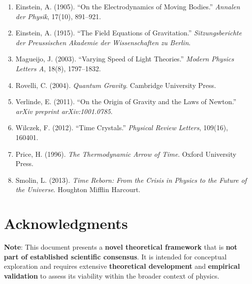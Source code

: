 \documentclass[12pt]{article}
\begin{document}
\begin{enumerate}
    \item Einstein, A. (1905). ``On the Electrodynamics of Moving Bodies.'' \textit{Annalen der Physik}, 17(10), 891--921.
    \item Einstein, A. (1915). ``The Field Equations of Gravitation.'' \textit{Sitzungsberichte der Preussischen Akademie der Wissenschaften zu Berlin}.
    \item Magueijo, J. (2003). ``Varying Speed of Light Theories.'' \textit{Modern Physics Letters A}, 18(8), 1797--1832.
    \item Rovelli, C. (2004). \textit{Quantum Gravity}. Cambridge University Press.
    \item Verlinde, E. (2011). ``On the Origin of Gravity and the Laws of Newton.'' \textit{arXiv preprint arXiv:1001.0785}.
    \item Wilczek, F. (2012). ``Time Crystals.'' \textit{Physical Review Letters}, 109(16), 160401.
    \item Price, H. (1996). \textit{The Thermodynamic Arrow of Time}. Oxford University Press.
    \item Smolin, L. (2013). \textit{Time Reborn: From the Crisis in Physics to the Future of the Universe}. Houghton Mifflin Harcourt.
\end{enumerate}

\section*{Acknowledgments}

\textbf{Note}: This document presents a \textbf{novel theoretical framework} that is \textbf{not part of established scientific consensus}. It is intended for conceptual exploration and requires extensive \textbf{theoretical development} and \textbf{empirical validation} to assess its viability within the broader context of physics.
\end{document}
